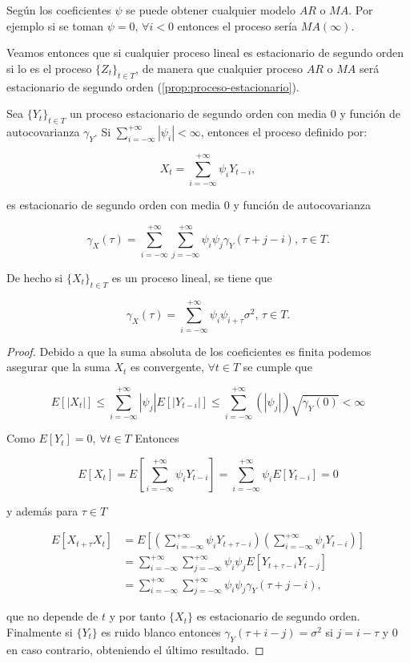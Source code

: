 Según los coeficientes $\psi$ se puede obtener cualquier modelo $AR$ o $MA$. Por ejemplo si se toman $\psi = 0, \, \forall i < 0$ entonces el proceso sería $MA(\infty)$.

Veamos entonces que si cualquier proceso lineal es estacionario de segundo orden si lo es el proceso $\{Z_t\}_{t \in T}$, de manera que cualquier proceso $AR$ o $MA$ será estacionario de segundo orden (\autoref{prop:proceso-estacionario}).

\begin{proposicion}
  Sea $\{Y_t\}_{t \in T}$ un proceso estacionario de segundo orden con media 0 y función de autocovarianza $\gamma_Y$. Si $\sum_{i = -\infty}^{+\infty} |\psi_i| < \infty$, entonces el proceso definido por:

  $$X_t = \sum \limits^{+\infty}_{i = -\infty} \psi_i Y_{t - i},$$

  es estacionario de segundo orden con media 0 y función de autocovarianza

  $$\gamma_X(\tau)= \sum \limits^{+\infty}_{i=-\infty}\sum \limits^{+\infty}_{j = -\infty} \psi_i \psi_j \gamma_Y(\tau + j - i), \, \tau \in T.$$

  De hecho si $\{X_t\}_{t \in T}$ es un proceso lineal, se tiene que

  $$\gamma_X(\tau) = \sum \limits^{+\infty}_{i = -\infty} \psi_{i} \psi_{i + \tau}\sigma^2, \, \tau \in T.$$
  \label{prop:proceso-estacionario}
\end{proposicion}

\begin{proof}
  Debido a que la suma absoluta de los coeficientes es finita podemos asegurar que la suma $X_t$ es convergente, $\forall t \in T$ se cumple que

  $$E[|X_t|] \leq \sum \limits^{+\infty}_{i = -\infty} |\psi_j| E[|Y_{t-i}|] \leq \sum \limits^{+\infty}_{i = -\infty} \left(|\psi_j|\right) \sqrt{\gamma_Y(0)} < \infty$$

  Como $E[Y_t] = 0, \, \forall t \in T$ Entonces

  $$E[X_t] = E\left[\sum \limits^{+\infty}_{i = -\infty} \psi_i Y_{t - i}\right] = \sum \limits^{+\infty}_{i = -\infty} \psi_i E[Y_{t-i}] = 0$$

  y además para $\tau \in T$

  $$\begin{aligned}
    E[X_{t+\tau}X_t] & = E\left[\left(\sum \limits^{+\infty}_{i = -\infty} \psi_i Y_{t + \tau - i}\right)\left(\sum \limits^{+\infty}_{i = -\infty} \psi_i Y_{t -i}\right)\right] \\
    & = \sum \limits^{+\infty}_{i = -\infty} \sum \limits^{+\infty}_{j = -\infty} \psi_i \psi_j E[Y_{t+\tau-i}Y_{t-j}] \\
    & = \sum \limits^{+\infty}_{i = -\infty}  \sum \limits^{+\infty}_{j = -\infty} \psi_i \psi_j \gamma_Y(\tau + j - i),
  \end{aligned}$$

  que no depende de $t$ y por tanto $\{X_t\}$ es estacionario de segundo orden. Finalmente si $\{Y_t\}$ es ruido blanco entonces $\gamma_Y(\tau + i - j) = \sigma^2$ si $j = i - \tau$ y 0 en caso contrario, obteniendo el último resultado.
\end{proof}

